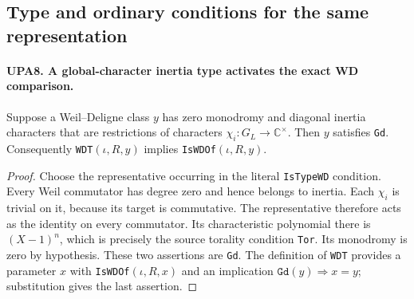 \subsection{Type and ordinary conditions for the same representation}

\paragraph{UPA8. A global-character inertia type activates the exact WD comparison.}
\label{claim:UPA8}
Suppose a Weil--Deligne class $y$ has zero monodromy and
diagonal inertia characters that are restrictions of
characters $\chi_i:G_L\to\mathbb C^\times$.
Then $y$ satisfies \texttt{Gd}.  Consequently
\texttt{WDT}$(\iota,R,y)$ implies
\texttt{IsWDOf}$(\iota,R,y)$.
\begin{proof}
Choose the representative occurring in the literal
\texttt{IsTypeWD} condition.  Every Weil commutator has
degree zero and hence belongs to inertia.  Each $\chi_i$
is trivial on it, because its target is commutative.
The representative therefore acts as the identity on
every commutator.  Its characteristic polynomial there
is $(X-1)^n$, which is precisely the source torality
condition \texttt{Tor}.  Its monodromy is zero by
hypothesis.  These two assertions are \texttt{Gd}.
The definition of \texttt{WDT} provides a parameter $x$
with \texttt{IsWDOf}$(\iota,R,x)$ and an implication
$\texttt{Gd}(y)\Rightarrow x=y$; substitution gives the
last assertion.
\end{proof}

